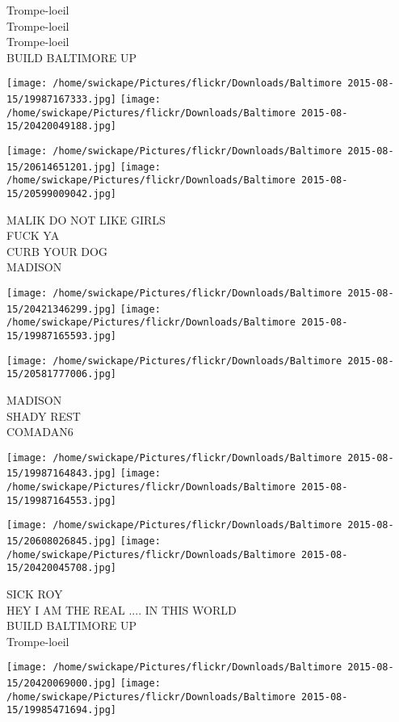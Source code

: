 \documentclass[10pt,letterpaper]{article}
\begin{document}
Trompe{-}loeil\\
Trompe{-}loeil\\
Trompe{-}loeil\\
BUILD BALTIMORE UP\\
\pagebreak

\texttt{[image: /home/swickape/Pictures/flickr/Downloads/Baltimore 2015-08-15/19987167333.jpg]}
\texttt{[image: /home/swickape/Pictures/flickr/Downloads/Baltimore 2015-08-15/20420049188.jpg]}

\texttt{[image: /home/swickape/Pictures/flickr/Downloads/Baltimore 2015-08-15/20614651201.jpg]}
\texttt{[image: /home/swickape/Pictures/flickr/Downloads/Baltimore 2015-08-15/20599009042.jpg]}

MALIK DO NOT LIKE GIRLS\\
FUCK YA\\
CURB YOUR DOG\\
MADISON\\
\pagebreak

\texttt{[image: /home/swickape/Pictures/flickr/Downloads/Baltimore 2015-08-15/20421346299.jpg]}
\texttt{[image: /home/swickape/Pictures/flickr/Downloads/Baltimore 2015-08-15/19987165593.jpg]}

\vspace{0.25in}
\texttt{[image: /home/swickape/Pictures/flickr/Downloads/Baltimore 2015-08-15/20581777006.jpg]}

MADISON\\
SHADY REST\\
COMADAN6\\
\pagebreak

\texttt{[image: /home/swickape/Pictures/flickr/Downloads/Baltimore 2015-08-15/19987164843.jpg]}
\texttt{[image: /home/swickape/Pictures/flickr/Downloads/Baltimore 2015-08-15/19987164553.jpg]}

\texttt{[image: /home/swickape/Pictures/flickr/Downloads/Baltimore 2015-08-15/20608026845.jpg]}
\texttt{[image: /home/swickape/Pictures/flickr/Downloads/Baltimore 2015-08-15/20420045708.jpg]}

SICK ROY\\
HEY I AM THE REAL .... IN THIS WORLD\\
BUILD BALTIMORE UP\\
Trompe{-}loeil\\
\pagebreak

\texttt{[image: /home/swickape/Pictures/flickr/Downloads/Baltimore 2015-08-15/20420069000.jpg]}
\texttt{[image: /home/swickape/Pictures/flickr/Downloads/Baltimore 2015-08-15/19985471694.jpg]}
\end{document}
